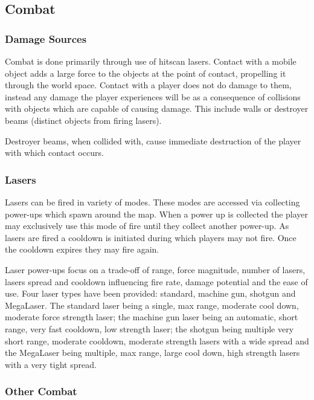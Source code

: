 \documentclass[10pt,a4paper]{article}
\begin{document}
\subsection{Combat}

\subsubsection{Damage Sources}

Combat is done primarily through use of hitscan lasers. Contact with a mobile object adds a large force to the objects at the point of contact, propelling it through the world space. Contact with a player does not do damage to them, instead any damage the player experiences will be as a consequence of collisions with objects which are capable of causing damage. This include walls or destroyer beams (distinct objects from firing lasers).

Destroyer beams, when collided with, cause immediate destruction of the player with which contact occurs.

\subsubsection{Lasers}

Lasers can be fired in variety of modes. These modes are accessed via collecting power-ups which spawn around the map. When a power up is collected the player may exclusively use this mode of fire until they collect another power-up. As lasers are fired a cooldown is initiated during which players may not fire. Once the cooldown expires they may fire again.

Laser power-ups focus on a trade-off of range, force magnitude, number of lasers, lasers spread and cooldown influencing fire rate, damage potential and the ease of use. Four laser types have been provided: standard, machine gun, shotgun and MegaLaser. The standard laser being a single, max range, moderate cool down, moderate force strength laser; the machine gun laser being an automatic, short range, very fast cooldown, low strength laser; the shotgun being multiple very short range, moderate cooldown, moderate strength lasers with a wide spread and the MegaLaser  being multiple, max range, large cool down, high strength lasers with a very tight spread.

\subsubsection{Other Combat}
\end{document}
